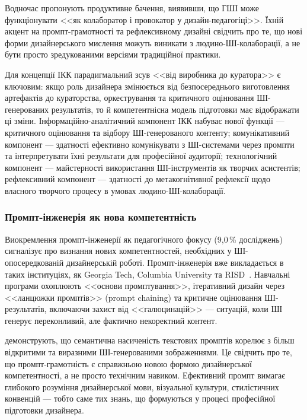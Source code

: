 Водночас \citet{MedelVera2025} пропонують продуктивне бачення, виявивши, що ГШІ може функціонувати <<як колаборатор і провокатор у дизайн-педагогіці>>. Їхній акцент на промпт-грамотності та рефлексивному дизайні свідчить про те, що нові форми дизайнерського мислення можуть виникати з людино-ШІ-колаборації, а не бути просто зредукованими версіями традиційної практики.

Для концепції ІКК парадигмальний зсув <<від виробника до куратора>> є ключовим: якщо роль дизайнера змінюється від безпосереднього виготовлення артефактів до кураторства, оркестрування та критичного оцінювання ШІ-генерованих результатів, то й компетентнісна модель підготовки має відображати ці зміни. Інформаційно-аналітичний компонент ІКК набуває нової функції --- критичного оцінювання та відбору ШІ-генерованого контенту; комунікативний компонент --- здатності ефективно комунікувати з ШІ-системами через промпти та інтерпретувати їхні результати для професійної аудиторії; технологічний компонент --- майстерності використання ШІ-інструментів як творчих асистентів; рефлексивний компонент --- здатності до метакогнітивної рефлексії щодо власного творчого процесу в умовах людино-ШІ-колаборації.

\subsubsection{Промпт-інженерія як нова компетентність}\label{sssec:1.2.11}

Виокремлення промпт-інженерії як педагогічного фокусу (9,0\,\% досліджень) сигналізує про визнання нових компетентностей, необхідних у ШІ-опосередкованій дизайнерській роботі. Промпт-інженерія вже викладається в таких інституціях, як Georgia Tech, Columbia University та RISD~\cite{MedelVera2025}. Навчальні програми охоплюють <<основи промптування>>, ітеративний дизайн через <<ланцюжки промптів>> (prompt chaining) та критичне оцінювання ШІ-результатів, включаючи захист від <<галюцинацій>> --- ситуацій, коли ШІ генерує переконливий, але фактично некоректний контент.

\citet{MedelVera2025} демонструють, що семантична насиченість текстових промптів корелює з більш відкритими та виразними ШІ-генерованими зображеннями. Це свідчить про те, що промпт-грамотність є справжньою новою формою дизайнерської компетентності, а не просто технічним навиком. Ефективний промпт вимагає глибокого розуміння дизайнерської мови, візуальної культури, стилістичних конвенцій --- тобто саме тих знань, що формуються у процесі професійної підготовки дизайнера.

